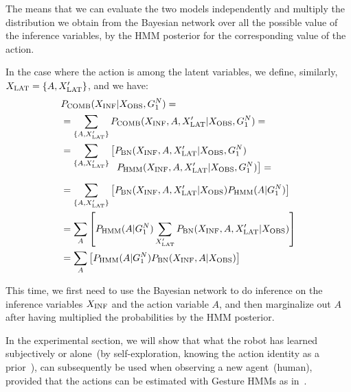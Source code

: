The means that we can evaluate the two models independently and multiply the distribution we obtain from the Bayesian network over all the possible value of the inference variables, by the HMM posterior for the corresponding value of the action.

In the case where the action is among the latent variables, we define, similarly, $X_\text{LAT} = \{A, X_\text{LAT}^\prime\}$, and we have:
\begin{align*}
  & \pcomb(\xinf| \xobs, G_1^N) = \\
  &= \sum_{\{A,\xlat^\prime\}} \pcomb(\xinf, A, \xlat^\prime| \xobs, G_1^N)=\\
  &= \sum_{\{A,\xlat^\prime\}} \left[\pbn(\xinf, A, \xlat^\prime| \xobs, G_1^N)\right. \\[-4mm]
    & \mspace{100mu} \left.\phmm(\xinf, A, \xlat^\prime| \xobs, G_1^N)\right]= \\[2mm]
  &= \sum_{\{A,\xlat^\prime\}} \left[\pbn(\xinf, A, \xlat^\prime| \xobs) \phmm(A | G_1^N)\right] \\
  &= \sum_{A}\left[\phmm(A | G_1^N)\sum_{\xlat^\prime} \pbn(\xinf, A, \xlat^\prime| \xobs)\right] \\
  &= \sum_{A}\left[\phmm(A | G_1^N) \pbn(\xinf, A| \xobs)\right] \\
\end{align*}

This time, we first need to use the Bayesian network to do inference on the inference variables $X_\text{INF}$ and the action variable $A$, and then marginalize out $A$ after having multiplied the probabilities by the HMM posterior.

%
%
%
%
In the experimental section, we will show that what the robot has learned subjectively or alone~(by self-exploration, knowing the action identity as a prior~\cite{salvi:2012:smcb}), can subsequently be used when observing a new agent~(human), provided that the actions can be estimated with Gesture \acp{HMM} as in~\cite{saponaro:2013:crhri}.
